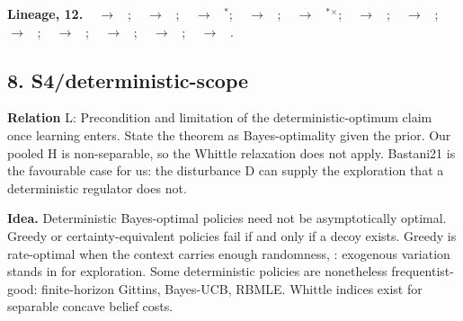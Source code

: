 \documentclass[10pt]{article}
\newcommand{\memb}[1]{\par\smallskip\textbf{#1}\quad}
\begin{document}
\memb{Lineage, 12.} {\footnotesize \citeauthor{Borkar-adaptive79}~\citeyear{Borkar-adaptive79} $\to$ \citeauthor{Kumar-new82}~\citeyear{Kumar-new82}; \citeauthor{Kumar-new82}~\citeyear{Kumar-new82} $\to$ \citeauthor{Mete-reward21}~\citeyear{Mete-reward21}; \citeauthor{Fudenberg-selfconfirming93}~\citeyear{Fudenberg-selfconfirming93} $\to$ \citeauthor{Esponda-berknash16}~\citeyear{Esponda-berknash16}$^\ast$; \citeauthor{Fudenberg-selfconfirming93}~\citeyear{Fudenberg-selfconfirming93} $\to$ \citeauthor{Zhu-mathematical26}~\citeyear{Zhu-mathematical26}; \citeauthor{Castagnoli-expected96}~\citeyear{Castagnoli-expected96} $\to$ \citeauthor{Esponda-equilibrium21}~\citeyear{Esponda-equilibrium21}$^\ast$$^\times$; \citeauthor{Esponda-berknash16}~\citeyear{Esponda-berknash16} $\to$ \citeauthor{Esponda-asymptotic21}~\citeyear{Esponda-asymptotic21}; \citeauthor{Esponda-berknash16}~\citeyear{Esponda-berknash16} $\to$ \citeauthor{Esponda-equilibrium21}~\citeyear{Esponda-equilibrium21}; \citeauthor{Esponda-berknash16}~\citeyear{Esponda-berknash16} $\to$ \citeauthor{Fudenberg-limit21}~\citeyear{Fudenberg-limit21}; \citeauthor{Esponda-berknash16}~\citeyear{Esponda-berknash16} $\to$ \citeauthor{Zhu-mathematical26}~\citeyear{Zhu-mathematical26}; \citeauthor{Keskin-incomplete18}~\citeyear{Keskin-incomplete18} $\to$ \citeauthor{Bastani-mostly21}~\citeyear{Bastani-mostly21}; \citeauthor{Keskin-incomplete18}~\citeyear{Keskin-incomplete18} $\to$ \citeauthor{Slivkins-greedy25}~\citeyear{Slivkins-greedy25}; \citeauthor{Esponda-equilibrium21}~\citeyear{Esponda-equilibrium21} $\to$ \citeauthor{Zhu-mathematical26}~\citeyear{Zhu-mathematical26}.}

\subsection{8. S4/deterministic-scope}\label{node:S4-S4-deterministic-scope}
\textbf{Relation} \textsf{L}: Precondition and limitation of the deterministic-optimum claim once learning enters. State the theorem as Bayes-optimality given the prior. Our pooled H is non-separable, so the Whittle relaxation does not apply. Bastani21 is the favourable case for us: the disturbance D can supply the exploration that a deterministic regulator does not.

\textbf{Idea.} Deterministic Bayes-optimal policies need not be asymptotically optimal. Greedy or certainty-equivalent policies fail if and only if a decoy exists. Greedy is rate-optimal when the context carries enough randomness, \citet{Bastani-mostly21}: exogenous variation stands in for exploration. Some deterministic policies are nonetheless frequentist-good: finite-horizon Gittins, Bayes-UCB, RBMLE. Whittle indices exist for separable concave belief costs.
\end{document}
